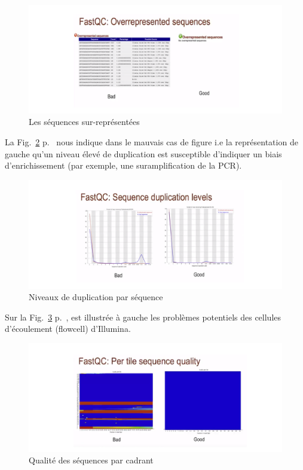 \documentclass[a4paper,11pt]{article}
\begin{document}
\begin{figure}
  \begin{center}
    \includegraphics[width=16cm]{Images/Fastqc_Plots5}
  \end{center}
  \caption{Les séquences sur-représentées}
  \label{fig-Fastqc_Plots5}
\end{figure}

La Fig.~\ref{fig-Fastqc_Plots6} p.~\pageref{fig-Fastqc_Plots6} nous
indique dans le mauvais cas de figure i.e la représentation de gauche
qu'un niveau élevé de duplication est susceptible d'indiquer un biais
d'enrichissement (par exemple, une suramplification de la PCR).

\begin{figure}
  \begin{center}
    \includegraphics[width=16cm]{Images/Fastqc_Plots6}
  \end{center}
  \caption{Niveaux de duplication par séquence}
  \label{fig-Fastqc_Plots6}
\end{figure}

Sur la Fig.~\ref{fig-Fastqc_Plots7} p.~\pageref{fig-Fastqc_Plots7},
est illustrée à gauche les problèmes potentiels des cellules
d'écoulement (flowcell) d'Illumina.

\begin{figure}
  \begin{center}
    \includegraphics[width=16cm]{Images/Fastqc_Plots7}
  \end{center}
  \caption{Qualité des séquences par cadrant}
  \label{fig-Fastqc_Plots7}
\end{figure}
\end{document}
